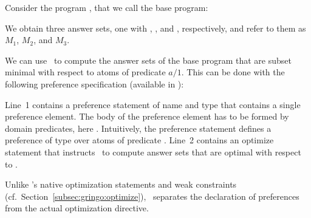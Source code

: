 \begin{example}
Consider the program
, 
that we call the base program:
%

%
We obtain three answer sets, one with , , and , respectively,
and refer to them as $M_1$, $M_2$, and $M_3$.

We can use \asprin\ to compute the answer sets of the base program that are subset minimal with respect to atoms of predicate $a/1$. 
This can be done with the following preference specification 
(available in ): 
%

%
Line~1 contains a preference statement of name  and type  that contains a single preference element.
The body of the preference element has to be formed by domain predicates, here .
Intuitively, the preference statement  defines a preference of type  over atoms of predicate . 
Line~2 contains an optimize statement that instructs \asprin\ to compute answer sets that are optimal with respect to . 

\begin{note}
Unlike \gringo's native optimization statements and weak constraints (cf.\ Section~\ref{subsec:gringo:optimize}),
\asprin\ separates the declaration of preferences from the actual optimization directive.
\end{note}


\end{example}
